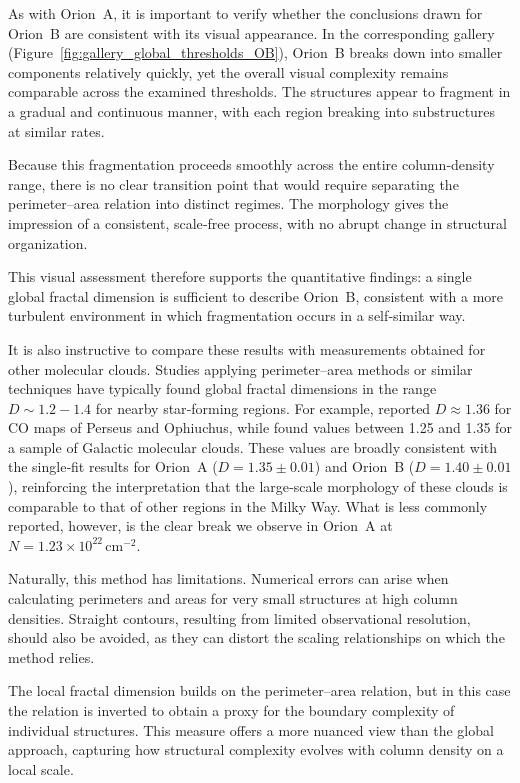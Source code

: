 As with Orion~A, it is important to verify whether the conclusions drawn for Orion~B are consistent with its visual appearance.  
In the corresponding gallery (Figure~\ref{fig:gallery_global_thresholds_OB}), Orion~B breaks down into smaller components relatively quickly, yet the overall visual complexity remains comparable across the examined thresholds.  
The structures appear to fragment in a gradual and continuous manner, with each region breaking into substructures at similar rates.

Because this fragmentation proceeds smoothly across the entire column‑density range, there is no clear transition point that would require separating the perimeter–area relation into distinct regimes.  
The morphology gives the impression of a consistent, scale‑free process, with no abrupt change in structural organization.  

This visual assessment therefore supports the quantitative findings: a single global fractal dimension is sufficient to describe Orion~B, consistent with a more turbulent environment in which fragmentation occurs in a self‑similar way.

It is also instructive to compare these results with measurements obtained for other molecular clouds.  
Studies applying perimeter–area methods or similar techniques have typically found global fractal dimensions in the range \(D \sim 1.2{-}1.4\) for nearby star‑forming regions.  
For example, \cite{falgarone1991hierarchical} reported \(D \approx 1.36\) for CO maps of Perseus and Ophiuchus, while \cite{sanchez2005fractal} found values between 1.25 and 1.35 for a sample of Galactic molecular clouds.  
These values are broadly consistent with the single‑fit results for Orion~A (\(D = 1.35 \pm 0.01\)) and Orion~B (\(D = 1.40 \pm 0.01\)), reinforcing the interpretation that the large‑scale morphology of these clouds is comparable to that of other regions in the Milky Way.
What is less commonly reported, however, is the clear break we observe in Orion~A at \(N = 1.23 \times 10^{22}\,\mathrm{cm}^{-2}\).

Naturally, this method has limitations.  
Numerical errors can arise when calculating perimeters and areas for very small structures at high column densities.  
Straight contours, resulting from limited observational resolution, should also be avoided, as they can distort the scaling relationships on which the method relies.

The local fractal dimension builds on the perimeter–area relation, but in this case the relation is inverted to obtain a proxy for the boundary complexity of individual structures.  
This measure offers a more nuanced view than the global approach, capturing how structural complexity evolves with column density on a local scale.

